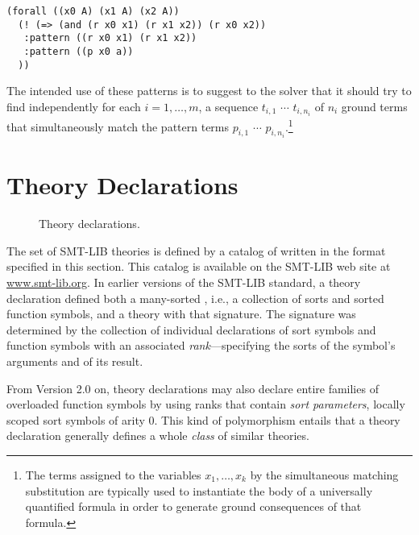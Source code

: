 \begin{lstlisting}[linewidth=31em]
(forall ((x0 A) (x1 A) (x2 A))
  (! (=> (and (r x0 x1) (r x1 x2)) (r x0 x2))
   :pattern ((r x0 x1) (r x1 x2)) 
   :pattern ((p x0 a)) 
  ))
\end{lstlisting}

The intended use of these patterns is to suggest to the solver that it should
try to find independently
for each $i=1,\ldots,m$, a sequence $t_{i,1}$  $\cdots$ $t_{i,n_i}$ of $n_i$ 
ground terms 
that simultaneously match the pattern terms $p_{i,1}$  $\cdots$ $p_{i,n_i}$.\footnote{%
The terms assigned to the variables $x_1, \ldots, x_k$ by the simultaneous 
matching substitution are typically used to instantiate the body 
of a universally quantified formula in order to generate ground consequences 
of that formula.
}

\section{Theory Declarations} \label{sec:theory-declarations}

\begin{figure}
\cTheories
\caption{Theory declarations.}
\label{fig:theory-decls}
\end{figure}

The set of SMT-LIB theories is defined by a catalog of 
written in the format specified in this section.  
This catalog is available on the SMT-LIB web site at \href{http://www.smt-lib.org}{www.smt-lib.org}.
In earlier versions of the SMT-LIB standard,
a theory declaration defined both a many-sorted ,
i.e., a collection of sorts and sorted function symbols,
and a theory with that signature.
The signature was determined by the collection 
of individual declarations of sort symbols
and function symbols with an associated \emph{rank}---specifying
the sorts of the symbol's arguments and of its result.

From Version 2.0 on, 
theory declarations may also declare entire families 
of overloaded function symbols by using ranks that contain 
\emph{sort parameters}, locally scoped sort symbols of arity 0. 
This kind of polymorphism entails that a theory declaration generally defines 
a whole \emph{class} of similar theories.

